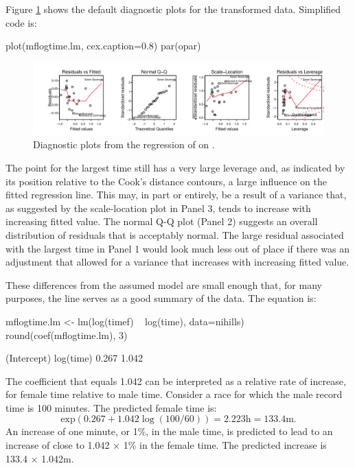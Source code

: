 Figure \ref{fig:diag-mftime-log} shows the default
diagnostic plots for the transformed data.
Simplified code is:
\begin{Schunk}
\begin{Sinput}
plot(mflogtime.lm, cex.caption=0.8)
par(opar)
\end{Sinput}
\end{Schunk}
\begin{figure}
\begin{Schunk}


\centerline{\includegraphics[width=\textwidth]{figs/8-diag-logmf-1} }

\end{Schunk}
\caption{Diagnostic plots from the regression of  on
  .}\label{fig:diag-mftime-log}
\end{figure}
\noindent
The point for the largest
time still has a very large leverage and, as indicated by its position
relative to the Cook's distance contours, a large influence on the
fitted regression line.  This may, in part or entirely, be a result of
a variance that, as suggested by the scale-location plot in Panel 3,
tends to increase with increasing fitted value.  The normal Q-Q plot
(Panel 2) suggests an overall distribution of residuals that is
acceptably normal.  The large residual associated with the largest
time in Panel 1 would look much less out of place if there was an
adjustment that allowed for a variance that increases with increasing
fitted value.

These differences from the assumed model are small enough that, for
many purposes, the line serves as a good summary of the data.  The
equation is:
\begin{Schunk}
\begin{Sinput}
mflogtime.lm <- lm(log(timef) ~ log(time),
                   data=nihills)
round(coef(mflogtime.lm), 3)
\end{Sinput}
\begin{Soutput}
(Intercept)   log(time) 
      0.267       1.042 
\end{Soutput}
\end{Schunk}
The coefficient that equals 1.042 can be interpreted as a relative rate of
increase, for female time relative to male time. Consider a race
for which the male record time is 100 minutes.  The predicted female
time is:
\[
\mbox{exp}(0.267 + 1.042 \log(100/60))
= 2.223\mbox{h}
= 133.4\mbox{m}.
\]
An increase of one minute, or 1\%, in the male time, is predicted to lead
to an increase of close to 1.042 $\times$ 1\% in the
female time.  The predicted increase is 133.4 $\times$ 1.042m.

